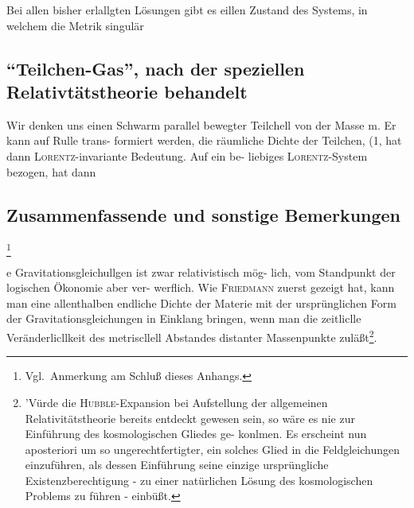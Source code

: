 
Bei allen bisher erlallgten Lösungen gibt es eillen
Zustand des Systems, in welchem die Metrik singulär

\subsection{\enquote{Teilchen-Gas}, nach der speziellen Relativtätstheorie behandelt}


Wir denken uns einen Schwarm parallel bewegter
Teilchell von der Masse m. Er kann auf Rulle trans-
formiert werden, die räumliche Dichte der Teilchen, (1,
hat dann \textsc{Lorentz}-invariante Bedeutung. Auf ein be-
liebiges \textsc{Lorentz}-System bezogen, hat dann


\subsection{Zusammenfassende und sonstige Bemerkungen}\footnote{Vgl.\ Anmerkung am Schluß dieses Anhangs.}


e Gravitationsgleichullgen ist zwar relativistisch mög-
lich, vom Standpunkt der logischen Ökonomie aber ver-
werflich. Wie \textsc{Friedmann} zuerst gezeigt hat, kann
man eine allenthalben endliche Dichte der Materie mit
der ursprünglichen Form der Gravitationsgleichungen
in Einklang bringen, wenn man die zeitliclle Veränderlicllkeit des metriscllell Abstandes distanter Massenpunkte zuläßt\footnote{'Vürde die \textsc{Hubble}-Expansion bei Aufstellung der allgemeinen Relativitätstheorie bereits entdeckt gewesen sein, so
wäre es nie zur Einführung des kosmologischen Gliedes ge-
konlmen. Es erscheint nun aposteriori um so ungerechtfertigter,
ein solches Glied in die Feldgleichungen einzuführen, als dessen
Einführung seine einzige ursprüngliche Existenzberechtigung
- zu einer natürlichen Lösung des kosmologischen Problems
zu führen - einbüßt.}.
